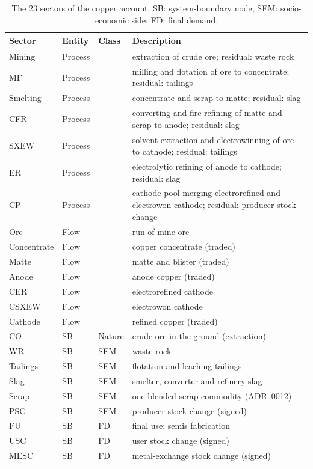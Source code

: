 \documentclass[11pt]{article}
\begin{document}
\begin{table}[h]
\centering\small
\begin{tabular}{@{}lllp{7.2cm}@{}}
\toprule
Sector & Entity & Class & Description \\
\midrule
Mining & Process & & extraction of crude ore; residual: waste rock \\
MF & Process & & milling and flotation of ore to concentrate; residual: tailings \\
Smelting & Process & & concentrate and scrap to matte; residual: slag \\
CFR & Process & & converting and fire refining of matte and scrap to anode; residual: slag \\
SXEW & Process & & solvent extraction and electrowinning of ore to cathode; residual: tailings \\
ER & Process & & electrolytic refining of anode to cathode; residual: slag \\
CP & Process & & cathode pool merging electrorefined and electrowon cathode; residual: producer stock change \\
Ore & Flow & & run-of-mine ore \\
Concentrate & Flow & & copper concentrate (traded) \\
Matte & Flow & & matte and blister (traded) \\
Anode & Flow & & anode copper (traded) \\
CER & Flow & & electrorefined cathode \\
CSXEW & Flow & & electrowon cathode \\
Cathode & Flow & & refined copper (traded) \\
CO & SB & Nature & crude ore in the ground (extraction) \\
WR & SB & SEM & waste rock \\
Tailings & SB & SEM & flotation and leaching tailings \\
Slag & SB & SEM & smelter, converter and refinery slag \\
Scrap & SB & SEM & one blended scrap commodity (ADR~0012) \\
PSC & SB & SEM & producer stock change (signed) \\
FU & SB & FD & final use: semis fabrication \\
USC & SB & FD & user stock change (signed) \\
MESC & SB & FD & metal-exchange stock change (signed) \\
\bottomrule
\end{tabular}
\caption{The 23 sectors of the copper account. SB: system-boundary node;
SEM: socio-economic side; FD: final demand.}
\label{tab:si-sectors}
\end{table}
\end{document}
